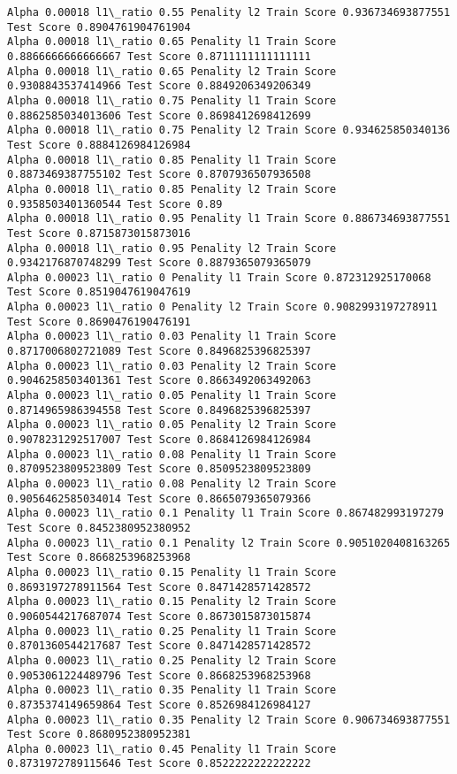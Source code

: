 \documentclass[11pt]{article}
\begin{document}
\begin{Verbatim}[commandchars=\\\{\}]
Alpha 0.00018 l1\_ratio 0.55 Penality l2 Train Score 0.936734693877551 Test Score 0.8904761904761904
Alpha 0.00018 l1\_ratio 0.65 Penality l1 Train Score 0.8866666666666667 Test Score 0.8711111111111111
Alpha 0.00018 l1\_ratio 0.65 Penality l2 Train Score 0.9308843537414966 Test Score 0.8849206349206349
Alpha 0.00018 l1\_ratio 0.75 Penality l1 Train Score 0.8862585034013606 Test Score 0.8698412698412699
Alpha 0.00018 l1\_ratio 0.75 Penality l2 Train Score 0.934625850340136 Test Score 0.8884126984126984
Alpha 0.00018 l1\_ratio 0.85 Penality l1 Train Score 0.8873469387755102 Test Score 0.8707936507936508
Alpha 0.00018 l1\_ratio 0.85 Penality l2 Train Score 0.9358503401360544 Test Score 0.89
Alpha 0.00018 l1\_ratio 0.95 Penality l1 Train Score 0.886734693877551 Test Score 0.8715873015873016
Alpha 0.00018 l1\_ratio 0.95 Penality l2 Train Score 0.9342176870748299 Test Score 0.8879365079365079
Alpha 0.00023 l1\_ratio 0 Penality l1 Train Score 0.872312925170068 Test Score 0.8519047619047619
Alpha 0.00023 l1\_ratio 0 Penality l2 Train Score 0.9082993197278911 Test Score 0.8690476190476191
Alpha 0.00023 l1\_ratio 0.03 Penality l1 Train Score 0.8717006802721089 Test Score 0.8496825396825397
Alpha 0.00023 l1\_ratio 0.03 Penality l2 Train Score 0.9046258503401361 Test Score 0.8663492063492063
Alpha 0.00023 l1\_ratio 0.05 Penality l1 Train Score 0.8714965986394558 Test Score 0.8496825396825397
Alpha 0.00023 l1\_ratio 0.05 Penality l2 Train Score 0.9078231292517007 Test Score 0.8684126984126984
Alpha 0.00023 l1\_ratio 0.08 Penality l1 Train Score 0.8709523809523809 Test Score 0.8509523809523809
Alpha 0.00023 l1\_ratio 0.08 Penality l2 Train Score 0.9056462585034014 Test Score 0.8665079365079366
Alpha 0.00023 l1\_ratio 0.1 Penality l1 Train Score 0.867482993197279 Test Score 0.8452380952380952
Alpha 0.00023 l1\_ratio 0.1 Penality l2 Train Score 0.9051020408163265 Test Score 0.8668253968253968
Alpha 0.00023 l1\_ratio 0.15 Penality l1 Train Score 0.8693197278911564 Test Score 0.8471428571428572
Alpha 0.00023 l1\_ratio 0.15 Penality l2 Train Score 0.9060544217687074 Test Score 0.8673015873015874
Alpha 0.00023 l1\_ratio 0.25 Penality l1 Train Score 0.8701360544217687 Test Score 0.8471428571428572
Alpha 0.00023 l1\_ratio 0.25 Penality l2 Train Score 0.9053061224489796 Test Score 0.8668253968253968
Alpha 0.00023 l1\_ratio 0.35 Penality l1 Train Score 0.8735374149659864 Test Score 0.8526984126984127
Alpha 0.00023 l1\_ratio 0.35 Penality l2 Train Score 0.906734693877551 Test Score 0.8680952380952381
Alpha 0.00023 l1\_ratio 0.45 Penality l1 Train Score 0.8731972789115646 Test Score 0.8522222222222222

\end{Verbatim}
\end{document}
